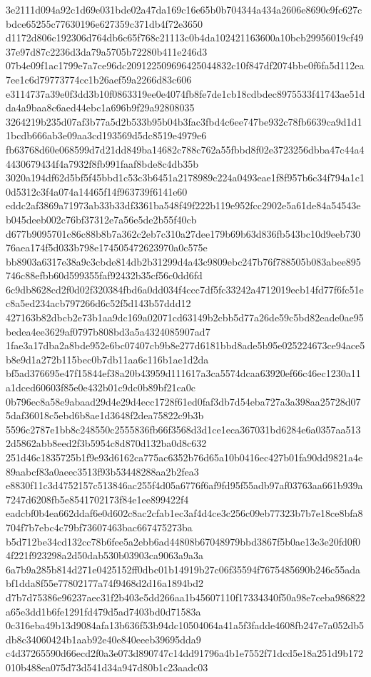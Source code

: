 \documentclass[11pt,a4paper]{article}
\begin{document}
{3e2111d094a92c1d69e031bde02a47da169c16e65b0b704344a434a2606e8690c9fc627cbdce65255c77630196e627359c371db4f72e3650
d1172d806c192306d764db6c65f768c21113c0b4da102421163600a10bcb29956019cf4937e97d87c2236d3da79a5705b72280b411e246d3
07b4e09f1ac1799e7a7ce96dc209122509696425044832c10f847df2074bbe0f6fa5d112ea7ee1c6d79773774cc1b26aef59a2266d83c606
e3114737a39e0f3dd3b10f0863319ee0e4074fb8fe7de1cb18cdbdec8975533f41743ae51dda4a9baa8c6aed44ebc1a696b9f29a92808035
3264219b235d07af3b77a5d2b533b95b04b3fac3fbd4c6ee747be932c78fb6639ca9d1d11bcdb666ab3e09aa3cd193569d5dc8519e4979e6
fb63768d60e068599d7d21dd849ba14682c788c762a55fbbd8f02e3723256dbba47c44a44430679434f4a7932f8fb991faaf8bde8c4db35b
3020a194df62d5bf5f45bbd1c53c3b6451a2178989c224a0493eae1f8f957b6c34f794a1c10d5312c3f4a074a14465f14f963739f6141e60
eddc2af3869a71973ab33b33df3361ba548f49f222b119e952fcc2902e5a61de84a54543eb045deeb002c76bf37312e7a56e5de2b55f40cb
d677b9095701c86c88b8b7a362c2eb7c310a27dee179b69b63d836fb543bc10d9eeb73076aea174f5d033b798e174505472623970a0c575e
bb8903a6317e38a9c3cbde814db2b31299d4a43c9809ebc247b76f788505b083abee895746c88efbb60d599355faf92432b35cf56c0dd6fd
6c9db8628cd2f0d02f320384fbd6a0dd034f4ccc7df5fc33242a4712019ecb14fd77f6fc51ec8a5ed234acb797266d6c52f5d143b57ddd12
427163b82dbcb2e73b1aa9dc169a02071cd63149b2cbb5d77a26de59c5bd82eade0ae95bedea4ee3629af0797b808bd3a5a4324085907ad7
1fae3a17dba2a8bde952e6bc07407cb9b8e277d6181bbd8ade5b95e025224673ce94ace5b8e9d1a272b115bec0b7db11aa6c116b1ae1d2da
bf5ad376695e47f15844ef38a20b43959d111617a3ca5574dcaa63920ef66c46ec1230a11a1dced60603f85e0e432b01c9dc0b89bf21ca0c
0b796ec8a58e9abaad29d4e29d4ecc1728f61ed0faf3db7d54eba727a3a398aa25728d075daf36018c5ebd6b8ae1d3648f2dea75822c9b3b
5596c2787e1bb8c248550c2555836fb66f3568d3d1ce1eca367031bd6284e6a0357aa5132d5862abb8eed2f3b5954c8d870d132ba0d8c632
251d46c1835725b1f9e93d6162ca775ac6352b76d65a10b0416ec427b01fa90dd9821a4e89aabcf83a0aeec3513f93b53448288aa2b2fea3
e8830f11c3d4752157c513846ac255f4d05a6776f6af9fd95f55adb97af03763aa661b939a7247d6208fb5e8541702173f84e1ee899422f4
eadcbf0b4ea662ddaf6e0d602c8ac2cfab1ec3af4d4ce3c256c09eb77323b7b7e18ce8bfa8704f7b7ebc4c79bf73607463bac667475273ba
b5d712be34cd132cc78b6fee5a2ebb6ad44808b67048979bbd3867f5b0ae13e3e20fd0f04f221f923298a2d50dab530b03903ca9063a9a3a
6a7b9a285b814d271e0425152ff0dbc01b14919b27c06f35594f7675485690b246c55adabf1dda8f55e77802177a74f9468d2d16a1894bd2
d7b7d75386e96237aec31f2b403e5dd266aa1b45607110f17334340f50a98e7ceba986822a65e3dd1b6fe1291fd479d5ad7403bd0d71583a
0c316eba49b13d9084afa13b636f53b94dc10504064a41a5f3fadde4608fb247e7a052db5db8c34060424b1aab92e40e840eeeb39695dda9
c4d37265590d66ecd2f0a3e073d890747c14dd91796a4b1e7552f71dcd5e18a251d9b172010b488ea075d73d541d34a947d80b1c23aadc03
}
\end{document}
